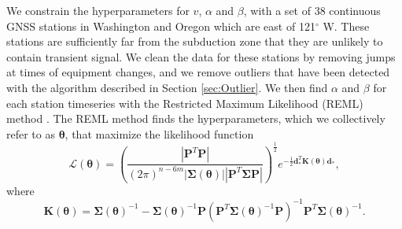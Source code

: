 \documentclass[10pt,letter]{article}
\begin{document}
We constrain the hyperparameters for $v$, $\alpha$ and $\beta$, with a set of 38 continuous GNSS stations in Washington and Oregon which are east of 121$^\circ$ W.  These stations are sufficiently far from the subduction zone that they are unlikely to contain transient signal.  We clean the data for these stations by removing jumps at times of equipment changes, and we remove outliers that have been detected with the algorithm described in Section \ref{sec:Outlier}. We then find $\alpha$ and $\beta$ for each station timeseries with the Restricted Maximum Likelihood (REML) method \cite[e.g.,][]{Harville1974,Cressie1992}. The REML method finds the hyperparameters, which we collectively refer to as $\bm{\theta}$, that maximize the likelihood function
\begin{equation}\label{eq:REML}
\mathcal{L}(\bm{\theta}) = \left(\frac{\left|\bm{P}^T\bm{P}\right|}
                           {(2\pi)^{n-6m} 
                           \left| \bm{\Sigma}(\bm{\theta}) \right| 
                           \left| \bm{P}^T\bm{\Sigma}\bm{P} \right|}\right)^{\frac{1}{2}} 
                           e^{-\tfrac{1}{2}\bm{d}_*^T\bm{K}(\bm{\theta})\bm{d}_*},
\end{equation}
where
\begin{equation}
\bm{K}(\bm{\theta}) = \bm{\Sigma}(\bm{\theta})^{-1} - 
                      \bm{\Sigma}(\bm{\theta})^{-1}\bm{P}
         \left(\bm{P}^T\bm{\Sigma}(\bm{\theta})^{-1}\bm{P}\right)^{-1}
         \bm{P}^T\bm{\Sigma}(\bm{\theta})^{-1}.
\end{equation}
\end{document}
